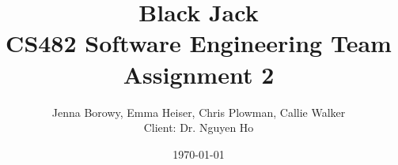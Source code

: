 \documentclass[12pt]{article} %
\title{Black Jack
\\
CS482 Software Engineering Team Assignment 2}
\author{Jenna Borowy, Emma Heiser, Chris Plowman, Callie Walker\\
Client: Dr. Nguyen Ho}
\date{\today}
\begin{document}
\maketitle

\pagebreak
\tableofcontents


\pagebreak
\doublespacing 







 



%


\end{document}
